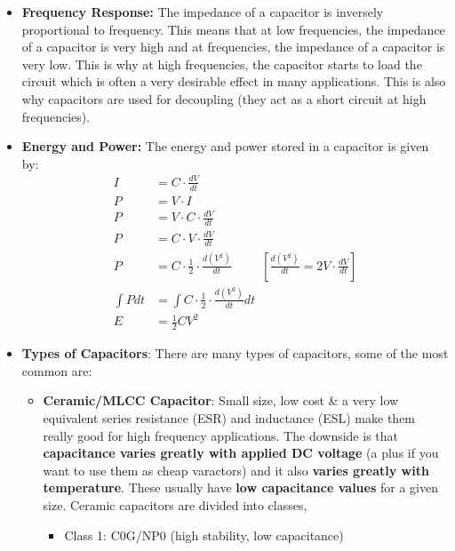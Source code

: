 \begin{itemize}
    You'll notice when we apply KCL to circuits within this book,
    we'll mostly use admittance \(Y\) to express the impedance, we
    do this as it simplifies the analysis a lot. The admittance
    version of Ohm's law is:
    \[
      I = V \cdot Y
    \]
  \item \textbf{Frequency Response:}
    The impedance of a capacitor is inversely proportional to
    frequency. This means that at low frequencies, the impedance
    of a capacitor is very high and at frequencies, the impedance
    of a capacitor is very low. This is why at high frequencies,
    the capacitor starts to load the circuit which is often a
    very desirable effect in many applications. This is also why
    capacitors are used for decoupling (they act as a short
    circuit at high frequencies).
  \item \textbf{Energy and Power:}
    The energy and power stored in a capacitor is given by:
    \begin{align*}
      I &= C \cdot \frac{dV}{dt} \\
      P &= V \cdot I \\
      P &= V \cdot C \cdot \frac{dV}{dt} \\
      P &= C \cdot V \cdot \frac{dV}{dt} \\
      P &= C \cdot \frac{1}{2} \cdot \frac{d(V^2)}{dt} \hspace{1cm} [\frac{d(V^2)}{dt} = 2V \cdot \frac{dV}{dt}] \\
      \int P dt &= \int C \cdot \frac{1}{2} \cdot \frac{d(V^2)}{dt} dt \\
      E &= \frac{1}{2} C V^2
    \end{align*}
  \item \textbf{Types of Capacitors}:
    There are many types of capacitors, some of the most common are:
        \begin{itemize}
      \item \textbf{Ceramic/MLCC Capacitor}: Small size, low cost \& a
        very low equivalent series resistance (ESR) and inductance (ESL) make
        them really good for high frequency applications. The downside
        is that \textbf{capacitance varies greatly with applied DC voltage} (a plus
        if you want to use them as cheap varactors) and it also
        \textbf{varies greatly with temperature}. These usually have \textbf{low
        capacitance values} for a given size. Ceramic capacitors are divided
        into classes,
        \begin{itemize}
          \item Class 1: C0G/NP0 (high stability, low capacitance)

\end{itemize}
\end{itemize}
\end{itemize}
